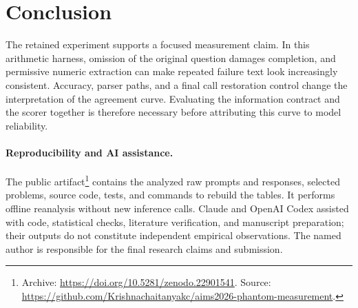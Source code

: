 \documentclass{article}
\begin{document}
\section{Conclusion}
The retained experiment supports a focused measurement claim. In this arithmetic harness, omission of the original question damages completion, and permissive numeric extraction can make repeated failure text look increasingly consistent. Accuracy, parser paths, and a final call restoration control change the interpretation of the agreement curve. Evaluating the information contract and the scorer together is therefore necessary before attributing this curve to model reliability.

\paragraph{Reproducibility and AI assistance.}
The public artifact\footnote{Archive: \url{https://doi.org/10.5281/zenodo.22901541}. Source: \url{https://github.com/Krishnachaitanyakc/aims2026-phantom-measurement}.} contains the analyzed raw prompts and responses, selected problems, source code, tests, and commands to rebuild the tables. It performs offline reanalysis without new inference calls. Claude and OpenAI Codex assisted with code, statistical checks, literature verification, and manuscript preparation; their outputs do not constitute independent empirical observations. The named author is responsible for the final research claims and submission.




\appendix
\end{document}
